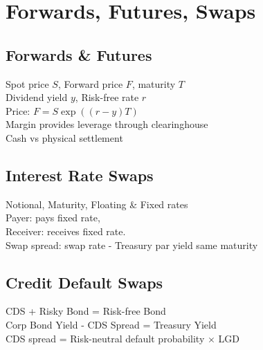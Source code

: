 \section{Forwards, Futures, Swaps}
	\subsection*{Forwards \& Futures}
	Spot price $S$, Forward price $F$, maturity $T$\\
	Dividend yield $y$, Risk-free rate $r$\\
	Price: $F = S\exp\left(\left(r - y\right)T\right)$\\
	Margin provides leverage through clearinghouse\\
	Cash vs physical settlement
	
	\subsection*{Interest Rate Swaps}
	Notional, Maturity, Floating \& Fixed rates\\
	Payer: pays fixed rate,\\
	Receiver: receives fixed rate.\\
	Swap spread: swap rate - Treasury par yield same maturity
	
	\subsection*{Credit Default Swaps}
	CDS + Risky Bond = Risk-free Bond\\
	Corp Bond Yield - CDS Spread = Treasury Yield\\
	CDS spread = Risk-neutral default probability $\times$ LGD
